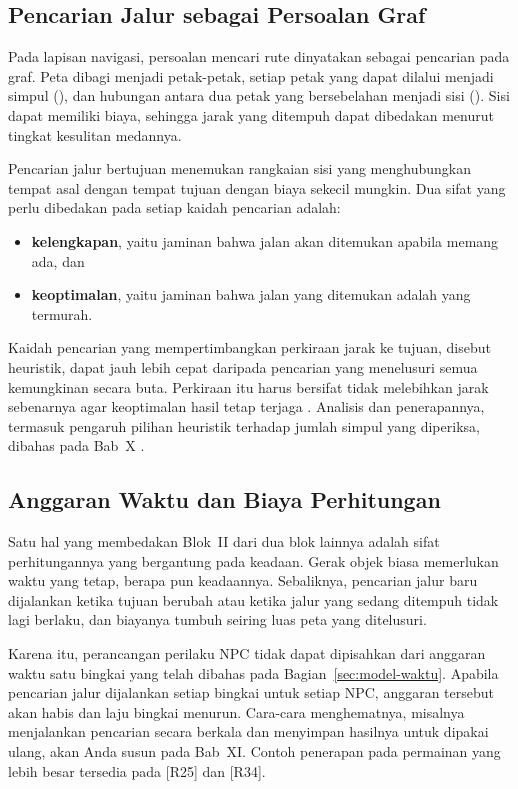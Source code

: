 \subsection{Pencarian Jalur sebagai Persoalan Graf}

Pada lapisan navigasi, persoalan mencari rute dinyatakan sebagai pencarian pada
graf. Peta dibagi menjadi petak-petak, setiap petak yang dapat dilalui menjadi
simpul (), dan hubungan antara dua petak yang bersebelahan
menjadi sisi (). Sisi dapat memiliki biaya, sehingga jarak yang
ditempuh dapat dibedakan menurut tingkat kesulitan medannya.

Pencarian jalur bertujuan menemukan rangkaian sisi yang menghubungkan tempat
asal dengan tempat tujuan dengan biaya sekecil mungkin. Dua sifat yang perlu
dibedakan pada setiap kaidah pencarian adalah:

\begin{itemize}
  \item \textbf{kelengkapan}, yaitu jaminan bahwa jalan akan ditemukan apabila
        memang ada, dan
  \item \textbf{keoptimalan}, yaitu jaminan bahwa jalan yang ditemukan adalah
        yang termurah.
\end{itemize}

Kaidah pencarian yang mempertimbangkan perkiraan jarak ke tujuan, disebut
heuristik, dapat jauh lebih cepat daripada pencarian yang menelusuri semua
kemungkinan secara buta. Perkiraan itu harus bersifat tidak melebihkan jarak
sebenarnya agar keoptimalan hasil tetap terjaga \cite{munir-astar}. Analisis
dan penerapannya, termasuk pengaruh pilihan heuristik terhadap jumlah simpul
yang diperiksa, dibahas pada Bab~X \cite{santos-pathfinding}.

\subsection{Anggaran Waktu dan Biaya Perhitungan}

Satu hal yang membedakan Blok~II dari dua blok lainnya adalah sifat
perhitungannya yang bergantung pada keadaan. Gerak objek biasa memerlukan
waktu yang tetap, berapa pun keadaannya. Sebaliknya, pencarian jalur baru
dijalankan ketika tujuan berubah atau ketika jalur yang sedang ditempuh tidak
lagi berlaku, dan biayanya tumbuh seiring luas peta yang ditelusuri.

Karena itu, perancangan perilaku NPC tidak dapat dipisahkan dari anggaran
waktu satu bingkai yang telah dibahas pada Bagian~\ref{sec:model-waktu}.
Apabila pencarian jalur dijalankan setiap bingkai untuk setiap NPC, anggaran
tersebut akan habis dan laju bingkai menurun. Cara-cara menghematnya, misalnya
menjalankan pencarian secara berkala dan menyimpan hasilnya untuk dipakai
ulang, akan Anda susun pada Bab~XI. Contoh penerapan pada permainan yang lebih
besar tersedia pada \mbox{[R25]} dan \mbox{[R34]}.
